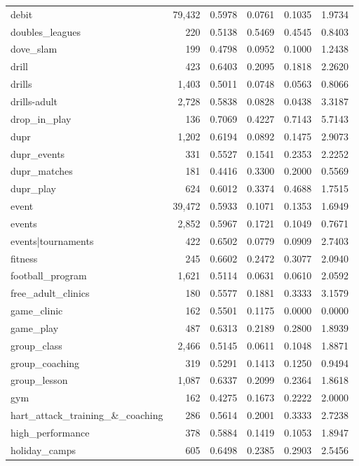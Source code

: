 \begin{table}[htbp]
\begin{tabular}{lrrrrr}
  debit & 79,432 & 0.5978 & 0.0761 & 0.1035 & 1.9734 \\
  doubles\_leagues & 220 & 0.5138 & 0.5469 & 0.4545 & 0.8403 \\
  dove\_slam & 199 & 0.4798 & 0.0952 & 0.1000 & 1.2438 \\
  drill & 423 & 0.6403 & 0.2095 & 0.1818 & 2.2620 \\
  drills & 1,403 & 0.5011 & 0.0748 & 0.0563 & 0.8066 \\
  drills-adult & 2,728 & 0.5838 & 0.0828 & 0.0438 & 3.3187 \\
  drop\_in\_play & 136 & 0.7069 & 0.4227 & 0.7143 & 5.7143 \\
  dupr & 1,202 & 0.6194 & 0.0892 & 0.1475 & 2.9073 \\
  dupr\_events & 331 & 0.5527 & 0.1541 & 0.2353 & 2.2252 \\
  dupr\_matches & 181 & 0.4416 & 0.3300 & 0.2000 & 0.5569 \\
  dupr\_play & 624 & 0.6012 & 0.3374 & 0.4688 & 1.7515 \\
  event & 39,472 & 0.5933 & 0.1071 & 0.1353 & 1.6949 \\
  events & 2,852 & 0.5967 & 0.1721 & 0.1049 & 0.7671 \\
  events|tournaments & 422 & 0.6502 & 0.0779 & 0.0909 & 2.7403 \\
  fitness & 245 & 0.6602 & 0.2472 & 0.3077 & 2.0940 \\
  football\_program & 1,621 & 0.5114 & 0.0631 & 0.0610 & 2.0592 \\
  free\_adult\_clinics & 180 & 0.5577 & 0.1881 & 0.3333 & 3.1579 \\
  game\_clinic & 162 & 0.5501 & 0.1175 & 0.0000 & 0.0000 \\
  game\_play & 487 & 0.6313 & 0.2189 & 0.2800 & 1.8939 \\
  group\_class & 2,466 & 0.5145 & 0.0611 & 0.1048 & 1.8871 \\
  group\_coaching & 319 & 0.5291 & 0.1413 & 0.1250 & 0.9494 \\
  group\_lesson & 1,087 & 0.6337 & 0.2099 & 0.2364 & 1.8618 \\
  gym & 162 & 0.4275 & 0.1673 & 0.2222 & 2.0000 \\
  hart\_attack\_training\_\&\_coaching & 286 & 0.5614 & 0.2001 & 0.3333 & 2.7238 \\
  high\_performance & 378 & 0.5884 & 0.1419 & 0.1053 & 1.8947 \\
  holiday\_camps & 605 & 0.6498 & 0.2385 & 0.2903 & 2.5456 \\

\end{tabular}
\end{table}
